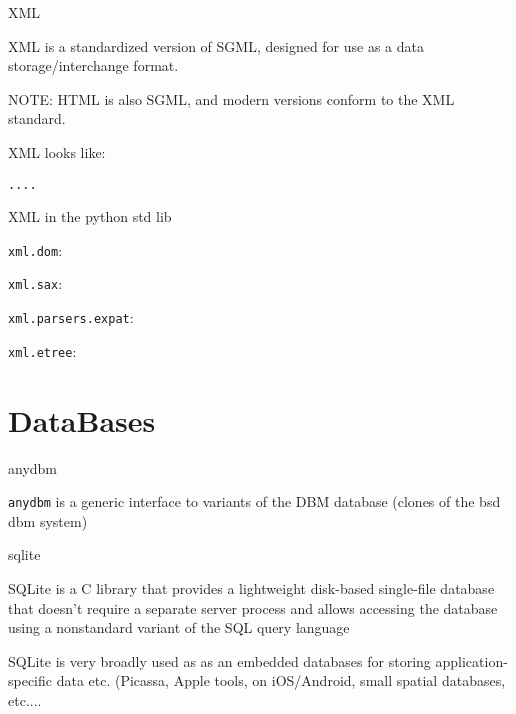 \documentclass{beamer}
\begin{document}
\begin{frame}[fragile]{XML}

\vfill
{\Large XML is a standardized version of SGML, designed for use as a data
        storage/interchange format.}

\vfill
{\Large NOTE: HTML is also SGML, and modern versions conform to the XML standard.}

\vfill
{\Large XML looks like:}

\begin{verbatim} 
....
\end{verbatim} 

\end{frame} 

\begin{frame}[fragile]{XML in the python std lib}


\vfill
{\Large \verb|xml.dom|: }

\vfill
{\Large \verb|xml.sax|: }

\vfill
{\Large \verb|xml.parsers.expat|: }

\vfill
{\Large \verb|xml.etree|: }


\end{frame} 



\section{DataBases} 

\begin{frame}[fragile]{anydbm}

\vfill
{\Large \verb|anydbm| is a generic interface to variants of the DBM database (clones of the bsd dbm system)}

\end{frame} 

\begin{frame}[fragile]{sqlite}

\vfill
{\Large SQLite is a C library that provides a lightweight disk-based single-file database
        that doesn't require a separate server process and allows accessing the
        database using a nonstandard variant of the SQL query language}

\vfill
{\Large SQLite is very broadly used as as an embedded databases for storing
        application-specific data etc. (Picassa, Apple tools, on iOS/Android,
        small spatial databases, etc....}


\vfill

\end{frame} 
\end{document}
